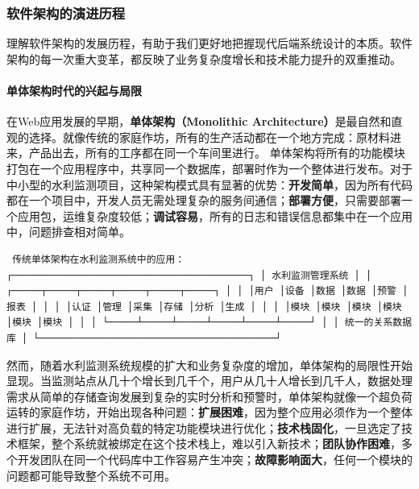 \subsubsection{软件架构的演进历程}\label{ux8f6fux4ef6ux67b6ux6784ux7684ux6f14ux8fdbux5386ux7a0b}
理解软件架构的发展历程，有助于我们更好地把握现代后端系统设计的本质。软件架构的每一次重大变革，都反映了业务复杂度增长和技术能力提升的双重推动。
\paragraph{单体架构时代的兴起与局限}\label{ux5355ux4f53ux67b6ux6784ux65f6ux4ee3ux7684ux5174ux8d77ux4e0eux5c40ux9650}
在Web应用发展的早期，\textbf{单体架构（Monolithic Architecture）}是最自然和直观的选择。就像传统的家庭作坊，所有的生产活动都在一个地方完成：原材料进来，产品出去，所有的工序都在同一个车间里进行。
单体架构将所有的功能模块打包在一个应用程序中，共享同一个数据库，部署时作为一个整体进行发布。对于中小型的水利监测项目，这种架构模式具有显著的优势：\textbf{开发简单}，因为所有代码都在一个项目中，开发人员无需处理复杂的服务间通信；\textbf{部署方便}，只需要部署一个应用包，运维复杂度较低；\textbf{调试容易}，所有的日志和错误信息都集中在一个应用中，问题排查相对简单。
\begin{lstlisting} 传统单体架构在水利监测系统中的应用： ┌─────────────────────────────────────────┐ │ 水利监测管理系统 │ │
┌─────┬─────┬─────┬─────┬─────┬─────┐ │ │ │用户 │设备 │数据 │数据 │预警 │报表 │ │ │ │认证 │管理 │采集 │存储 │分析 │生成 │ │ │ │模块 │模块 │模块 │模块
│模块 │模块 │ │ │ └─────┴─────┴─────┴─────┴─────┴─────┘ │ │ 统一的关系数据库 │ └─────────────────────────────────────────┘
\end{lstlisting}
然而，随着水利监测系统规模的扩大和业务复杂度的增加，单体架构的局限性开始显现。当监测站点从几十个增长到几千个，用户从几十人增长到几千人，数据处理需求从简单的存储查询发展到复杂的实时分析和预警时，单体架构就像一个超负荷运转的家庭作坊，开始出现各种问题：\textbf{扩展困难}，因为整个应用必须作为一个整体进行扩展，无法针对高负载的特定功能模块进行优化；\textbf{技术栈固化}，一旦选定了技术框架，整个系统就被绑定在这个技术栈上，难以引入新技术；\textbf{团队协作困难}，多个开发团队在同一个代码库中工作容易产生冲突；\textbf{故障影响面大}，任何一个模块的问题都可能导致整个系统不可用。
